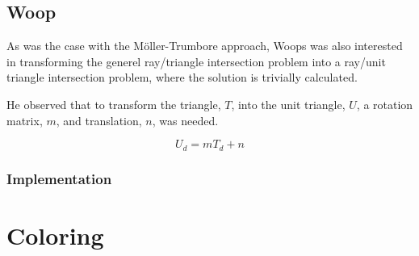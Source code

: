\subsection{Woop}


As was the case with the Möller-Trumbore approach, Woops was also
interested in transforming the generel ray/triangle intersection
problem into a ray/unit triangle intersection problem, where the
solution is trivially calculated.

He observed that to transform the triangle, $T$, into the unit
triangle, $U$, a rotation matrix, $m$, and translation, $n$, was
needed.

\begin{displaymath}
  U_d = m T_d + n
\end{displaymath}



\subsubsection{Implementation}




\section{Coloring}


